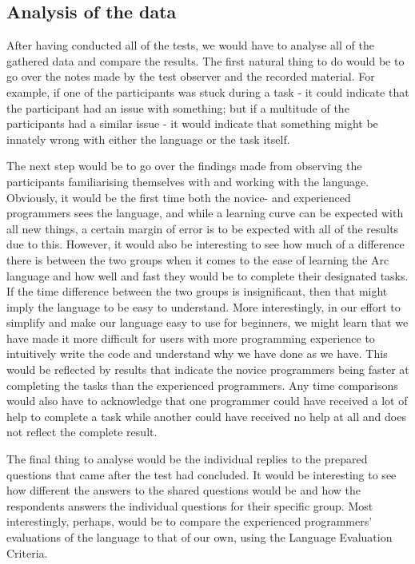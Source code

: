 \subsection{Analysis of the data}\label{subsubsec:analysisOfTheData}

After having conducted all of the tests, we would have to analyse all of the gathered data and compare the results. The first natural thing to do would be to go over the notes made by the test observer and the recorded material. For example, if one of the participants was stuck during a task - it could indicate that the participant had an issue with something; but if a multitude of the participants had a similar issue - it would indicate that something might be innately wrong with either the language or the task itself.

The next step would be to go over the findings made from observing the participants familiarising themselves with and working with the language. Obviously, it would be the first time both the novice- and experienced programmers sees the language, and while a learning curve can be expected with all new things, a certain margin of error is to be expected with all of the results due to this. However, it would also be interesting to see how much of a difference there is between the two groups when it comes to the ease of learning the Arc language and how well and fast they would be to complete their designated tasks. If the time difference between the two groups is insignificant, then that might imply the language to be easy to understand. More interestingly, in our effort to simplify and make our language easy to use for beginners, we might learn that we have made it more difficult for users with more programming experience to intuitively write the code and understand why we have done as we have. This would be reflected by results that indicate the novice programmers being faster at completing the tasks than the experienced programmers. Any time comparisons would also have to acknowledge that one programmer could have received a lot of help to complete a task while another could have received no help at all and does not reflect the complete result.

The final thing to analyse would be the individual replies to the prepared questions that came after the test had concluded. It would be interesting to see how different the answers to the shared questions would be and how the respondents answers the individual questions for their specific group. Most interestingly, perhaps, would be to compare the experienced programmers' evaluations of the language to that of our own, using the Language Evaluation Criteria.

